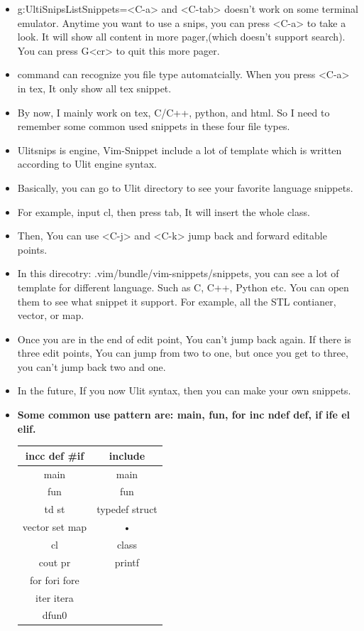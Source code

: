 \documentclass[a4paper,12pt,twoside]{book}
\begin{document}
\begin{itemize}
		\item g:UltiSnipsListSnippets=<C-a> and <C-tab> doesn't work on some terminal emulator. Anytime you want to use a snips, you can press <C-a> to take a look. It will show all content in more pager,(which doesn't support search). You can press G<cr> to quit this more pager.

		\item <C-a> command can recognize you file type automatcially. When you press <C-a> in tex, It only show all tex snippet. 

		\item By now, I mainly work on tex, C/C++, python, and html. So I need to remember some common used snippets in these four file types. 

\item Ulitsnips is engine, Vim-Snippet include a lot of template which is written according to Ulit engine syntax. 

\item Basically, you can go to Ulit directory to see your favorite language snippets. 

\item For example, input cl, then press tab, It will insert the whole class. 

\item Then, You can use <C-j> and <C-k> jump back and forward editable points. 

\item In this direcotry: .vim/bundle/vim-snippets/snippets, you can see a lot of template for different language. Such as C, C++, Python etc. You can open them to see what snippet it support. For example, all the STL contianer, vector, or map. 

\item Once you are in the end of edit point, You can't jump back again. If there is three edit points, You can jump from two to one, but once you get to three, you can't jump back two and one. 

\item In the future, If you now Ulit syntax, then you can make your own snippets. 
\item \textbf{Some common use pattern are: 	main, fun, for inc ndef def, if ife el elif.} 

\begin{tabular}{|c|c|}
\hline 
incc def \#if & include \\ 
\hline 
main & main \\ 
\hline 
fun & fun \\ 
\hline 
td st & typedef struct \\ 
\hline 
vector set map & • \\ 
\hline 
cl & class \\ 
\hline 
cout pr & printf \\ 
\hline 
for fori fore &  \\ 
\hline 
iter itera &  \\ 
\hline 
dfun0  &  \\ 

\hline 
\end{tabular} 
\end{itemize}
\end{document}
